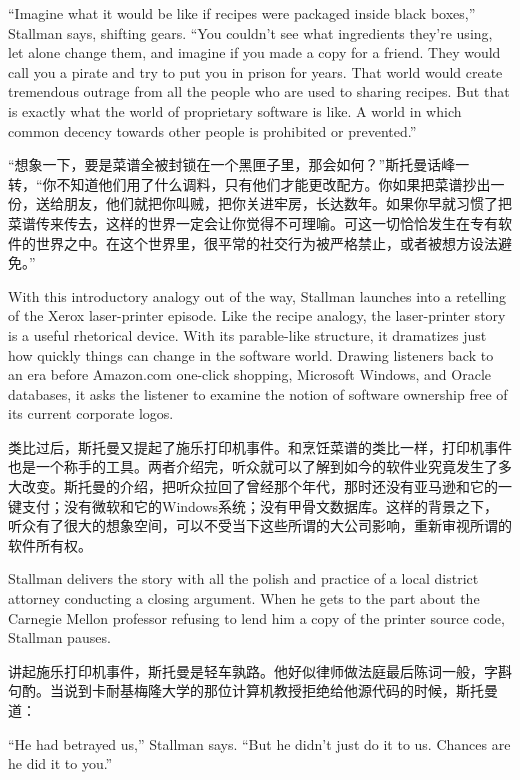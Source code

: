 \ifdefined\eng
``Imagine what it would be like if recipes were packaged inside black boxes,'' Stallman says, shifting gears. ``You couldn't see what ingredients they're using, let alone change them, and imagine if you made a copy for a friend. They would call you a pirate and try to put you in prison for years. That world would create tremendous outrage from all the people who are used to sharing recipes. But that is exactly what the world of proprietary software is like. A world in which common decency towards other people is prohibited or prevented.''
\fi

\ifdefined\chs
``想象一下，要是菜谱全被封锁在一个黑匣子里，那会如何？''斯托曼话峰一转，``你不知道他们用了什么调料，只有他们才能更改配方。你如果把菜谱抄出一份，送给朋友，他们就把你叫贼，把你关进牢房，长达数年。如果你早就习惯了把菜谱传来传去，这样的世界一定会让你觉得不可理喻。可这一切恰恰发生在专有软件的世界之中。在这个世界里，很平常的社交行为被严格禁止，或者被想方设法避免。''
\fi

\ifdefined\eng
With this introductory analogy out of the way, Stallman launches into a retelling of the Xerox laser-printer episode. Like the recipe analogy, the laser-printer story is a useful rhetorical device. With its parable-like structure, it dramatizes just how quickly things can change in the software world. Drawing listeners back to an era before Amazon.com one-click shopping, Microsoft Windows, and Oracle databases, it asks the listener to examine the notion of software ownership free of its current corporate logos.
\fi

\ifdefined\chs
类比过后，斯托曼又提起了施乐打印机事件。和烹饪菜谱的类比一样，打印机事件也是一个称手的工具。两者介绍完，听众就可以了解到如今的软件业究竟发生了多大改变。斯托曼的介绍，把听众拉回了曾经那个年代，那时还没有亚马逊和它的一键支付；没有微软和它的Windows系统；没有甲骨文数据库。这样的背景之下，听众有了很大的想象空间，可以不受当下这些所谓的大公司影响，重新审视所谓的软件所有权。
\fi

\ifdefined\eng
Stallman delivers the story with all the polish and practice of a local district attorney conducting a closing argument. When he gets to the part about the Carnegie Mellon professor refusing to lend him a copy of the printer source code, Stallman pauses.
\fi

\ifdefined\chs
讲起施乐打印机事件，斯托曼是轻车孰路。他好似律师做法庭最后陈词一般，字斟句酌。当说到卡耐基梅隆大学的那位计算机教授拒绝给他源代码的时候，斯托曼道：
\fi

\ifdefined\eng
``He had betrayed us,'' Stallman says. ``But he didn't just do it to us. Chances are he did it to you.''
\fi

